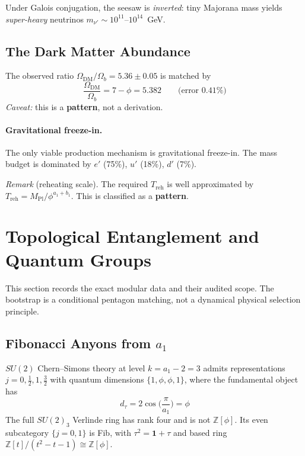 \documentclass[12pt,a4paper]{article}
\theoremstyle{definition}
\begin{document}
Under Galois conjugation, the seesaw is \emph{inverted}: tiny Majorana mass yields \emph{super-heavy} neutrinos $m_{\nu'} \sim 10^{11}\text{--}10^{14}$~GeV.

\subsection{The Dark Matter Abundance}

The observed ratio $\Omega_{\text{DM}} / \Omega_b = 5.36 \pm 0.05$ is matched by
\begin{equation}
\frac{\Omega_{\text{DM}}}{\Omega_b} = 7 - \phi = 5.382 \qquad \text{(error 0.41\%)}
\end{equation}
\textit{Caveat:} this is a \textbf{pattern}, not a derivation.

\paragraph{Gravitational freeze-in.}
The only viable production mechanism is gravitational freeze-in.  The mass budget is dominated by $e'$ (75\%), $u'$ (18\%), $d'$ (7\%).

\textit{Remark} (reheating scale).  The required $T_{\text{reh}}$ is well approximated by $T_{\text{reh}} = M_{\text{Pl}}/\phi^{a_1 + b_1}$.  This is classified as a \textbf{pattern}.


\section{Topological Entanglement and Quantum Groups}
\label{sec:S-tqft}

This section records the exact modular data and their audited scope.  The bootstrap is a conditional pentagon matching, not a dynamical physical selection principle.

\subsection{Fibonacci Anyons from \texorpdfstring{$a_1$}{a1}}

$SU(2)$ Chern--Simons theory at level $k = a_1 - 2 = 3$ admits representations $j = 0, \tfrac12, 1, \tfrac32$ with quantum dimensions $\{1, \phi, \phi, 1\}$, where the fundamental object has
\begin{equation}
d_\tau = 2\cos\!\Big(\frac{\pi}{a_1}\Big) = \phi
\end{equation}
The full \(SU(2)_3\) Verlinde ring has rank four and is not \(\mathbb Z[\phi]\).  Its even subcategory \(\{j=0,1\}\) is Fib, with \(\tau^2=\mathbf1+\tau\) and based ring \(\mathbb Z[t]/(t^2-t-1)\cong\mathbb Z[\phi]\).
\end{document}
